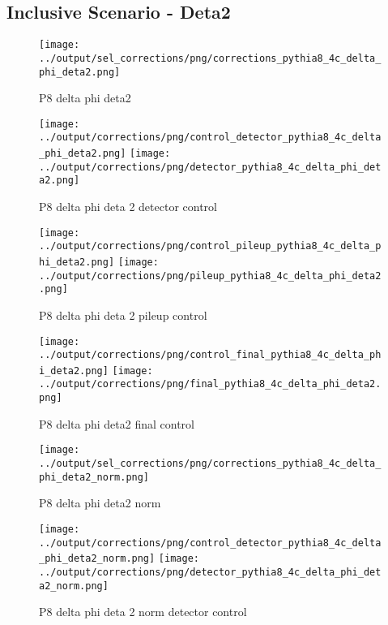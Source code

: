 \documentclass[11pt]{book}
\begin{document}
\clearpage
\subsection{Inclusive Scenario - Deta2}
\begin{figure}[ht]
\centering
\texttt{[image: ../output/sel\_corrections/png/corrections\_pythia8\_4c\_delta\_phi\_deta2.png]}
\caption{P8 delta phi deta2}
\label{fig:p8_delta_phi_deta2}
\end{figure}

\begin{figure}[ht]
\centering
\texttt{[image: ../output/corrections/png/control\_detector\_pythia8\_4c\_delta\_phi\_deta2.png]}
\texttt{[image: ../output/corrections/png/detector\_pythia8\_4c\_delta\_phi\_deta2.png]}
\caption{P8 delta phi deta 2 detector control}
\label{fig:p8_delta_phi_deta2_detector_control}
\end{figure}

\begin{figure}[ht]
\centering
\texttt{[image: ../output/corrections/png/control\_pileup\_pythia8\_4c\_delta\_phi\_deta2.png]}
\texttt{[image: ../output/corrections/png/pileup\_pythia8\_4c\_delta\_phi\_deta2.png]}
\caption{P8 delta phi deta 2 pileup control}
\label{fig:p8_delta_phi_deta2_pileup_control}
\end{figure}


\begin{figure}[ht]
\centering
\texttt{[image: ../output/corrections/png/control\_final\_pythia8\_4c\_delta\_phi\_deta2.png]}
\texttt{[image: ../output/corrections/png/final\_pythia8\_4c\_delta\_phi\_deta2.png]}
\caption{P8 delta phi deta2 final control}
\label{fig:p8_delta_phi_deta2_final_control}
\end{figure}

\begin{figure}[ht]
\centering
\texttt{[image: ../output/sel\_corrections/png/corrections\_pythia8\_4c\_delta\_phi\_deta2\_norm.png]}
\caption{P8 delta phi deta2 norm}
\label{fig:p8_delta_phi_deta2_norm}
\end{figure}


\begin{figure}[ht]
\centering
\texttt{[image: ../output/corrections/png/control\_detector\_pythia8\_4c\_delta\_phi\_deta2\_norm.png]}
\texttt{[image: ../output/corrections/png/detector\_pythia8\_4c\_delta\_phi\_deta2\_norm.png]}
\caption{P8 delta phi deta 2 norm detector control}
\label{fig:p8_delta_phi_deta2_norm_detector_control}
\end{figure}
\end{document}
